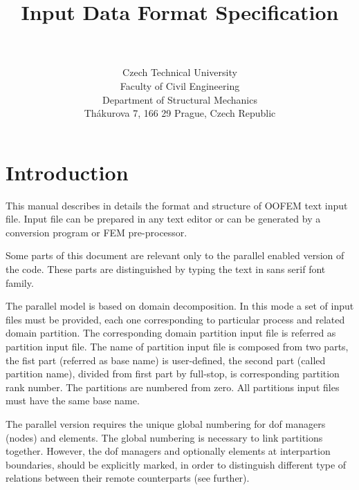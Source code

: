\documentclass[a4paper]{article}
\newcommand{\Pmode}[1]{{\sffamily #1}}
\begin{document}
\title{
Input Data Format Specification}
\author{\bp \\ \\
Czech Technical University\\
Faculty of Civil Engineering\\
Department of Structural Mechanics\\
Th\'akurova 7, 166 29 Prague, Czech Republic
}
\maketitle

\newpage
\tableofcontents
\newpage
\section{Introduction}
This manual describes in details the format and structure of OOFEM
text input file. Input file can be prepared in any text editor or can be generated
by a conversion program or FEM pre-processor.

\Pmode{Some parts of this document are relevant only to the parallel enabled version of the code.
These parts are distinguished by typing the text in sans serif font family.}
\Pmode{The parallel model is based on domain decomposition. In this mode a set of input files must be provided, each one corresponding to 
particular process and related domain partition. The corresponding domain partition input file is referred as partition input file. 
The name of partition input file is composed from two parts, the fist part (referred as base
name) is user-defined, the second part (called partition name), divided from first part by
full-stop, is corresponding partition rank number. The partitions are numbered
from zero. All partitions input files must have the
same base name.

The parallel version requires the unique global numbering  for
dof managers (nodes) and elements. The global
numbering is necessary to link partitions together. However, the dof
managers and optionally elements at interpartion boundaries,
should be explicitly  marked, in order to distinguish different type
of relations between their remote counterparts (see further).
}
\end{document}
